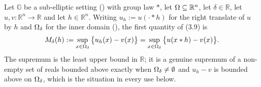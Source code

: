 \begin{definition}
Let $\mathbb G$ be a sub-elliptic setting () with group law $*$, let
$\Omega\subseteq\mathbb R^{n}$, let $\delta\in\mathbb R$, let
$u,v:\mathbb R^{n}\to\mathbb R$ and let $h\in\mathbb R^{n}$. Writing $u_h:=u(\cdot*h)$ for
the right translate of $u$ by $h$ and $\Omega_\delta$ for the inner domain
(), the first quantity of (3.9) is
\[
 M_\delta(h):=\sup_{x\in\Omega_\delta}\big\{u_h(x)-v(x)\big\}
 =\sup_{x\in\Omega_\delta}\big\{u(x*h)-v(x)\big\} .
\]
The supremum is the least upper bound in $\mathbb R$; it is a genuine supremum of a
non-empty set of reals bounded above exactly when $\Omega_\delta\neq\emptyset$ and $u_h-v$ is
bounded above on $\Omega_\delta$, which is the situation in every use below.
\end{definition}
